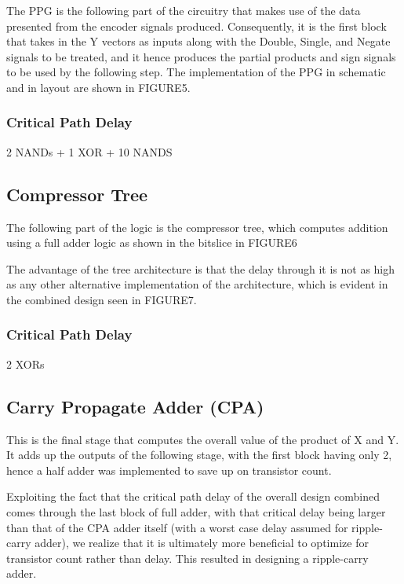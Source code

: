 \documentclass[conference]{IEEEtran}
\begin{document}
The PPG is the following part of the circuitry that makes use of the data presented from the encoder signals produced. Consequently, it is the first block that takes in the Y vectors as inputs along with the Double, Single, and Negate signals to be treated, and it hence produces the partial products and sign signals to be used by the following step. The implementation of the PPG in schematic and in layout are shown in FIGURE5.

\subsubsection{Critical Path Delay}

2 NANDs + 1 XOR + 10 NANDS


\subsection{Compressor Tree}

The following part of the logic is the compressor tree, which computes addition using a full adder logic as shown in the bitslice in FIGURE6

The advantage of the tree architecture is that the delay through it is not as high as any other alternative implementation of the architecture, which is evident in the combined design seen in FIGURE7.

\subsubsection{Critical Path Delay}

2 XORs


\subsection{Carry Propagate Adder (CPA)}

This is the final stage that computes the overall value of the product of X and Y. It adds up the outputs of the following stage, with the first block having only 2, hence a half adder was implemented to save up on transistor count.

Exploiting the fact that the critical path delay of the overall design combined comes through the last block of full adder, with that critical delay being larger than that of the CPA adder itself (with a worst case delay assumed for ripple-carry adder), we realize that it is ultimately more beneficial to optimize for transistor count rather than delay. This resulted in designing a ripple-carry adder.
\end{document}
